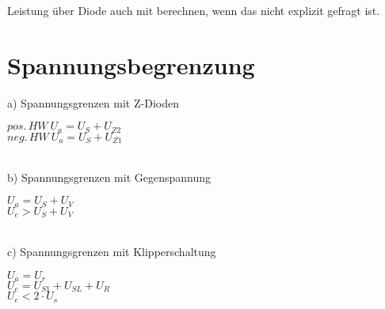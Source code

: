     Leistung über Diode auch mit berechnen, wenn das nicht explizit gefragt ist.\\
    

\section{Spannungsbegrenzung}\label{sec:spannungsbegrenzung}
    a) Spannungsgrenzen mit Z-Dioden\\
    \begin{minipage}{0.4\columnwidth}
        $pos.\, HW\: U_a=U_S+U_{Z2}$\\
        $neg.\, HW\: U_a=U_S+U_{Z1}$\\
    \end{minipage}
    \begin{minipage}{0.4\columnwidth}
    \end{minipage}\\
    b) Spannungsgrenzen mit Gegenspannung\\
    \begin{minipage}{0.4\columnwidth}
        $U_a=U_S+U_V$\\
        $U_e>U_S+U_V$\\
    \end{minipage}
    \begin{minipage}{0.4\columnwidth}
    \end{minipage}\\
    c) Spannungsgrenzen mit Klipperschaltung\\
    \begin{minipage}{0.4\columnwidth}
        $U_a=U_r$\\
        $U_e=U_{S1}+U_{SL}+U_R$\\
        $U_e<2\cdot U_s$\\
    \end{minipage}
    \begin{minipage}{0.4\columnwidth}
    \end{minipage}\\
    \pagebreak %

